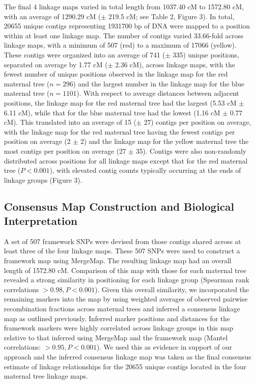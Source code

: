 \documentclass[11pt]{article}
\begin{document}
The final \num{4} linkage maps varied in total length from 1037.40 cM to 1572.80 cM, with an average of 1290.29 cM ($\pm$ 219.5 cM; see Table 2, Figure 3). 
In total, \num{20655} unique contigs representing \num{1931700} bp of DNA were mapped to a position within at least one linkage map. 
The number of contigs varied 33.66-fold across linkage maps, with a minimum of 507 (red) to a maximum of \num{17066} (yellow). 
These contigs were organized into an average of 741 ($\pm$ 335) unique positions, separated on average
by 1.77 cM ($\pm$ 2.36 cM), across linkage maps, with the fewest number of unique positions observed 
in the linkage map for the red maternal tree ($n = 296$) and the largest number in the linkage map for the blue maternal 
tree ($n = 1101$). With respect to average distances between adjacent positions, the linkage map for the red 
maternal tree had the largest (5.53 cM $\pm$ 6.11 cM), while that for the blue maternal tree had the lowest (1.16 cM $\pm$ 0.77 cM).
This translated into an average of 15 ($\pm$ 27) contigs per position on average, with the linkage map for the red maternal tree
having the fewest contigs per position on average (2 $\pm$ 2) and the linkage map for the yellow maternal tree the most contigs
per position on average (27 $\pm$ 35). Contigs were also non-randomly distributed across positions for all linkage maps except that
for the red maternal tree ($P < 0.001$), with elevated contig counts typically occurring at the ends of linkage groups (Figure 3).

\subsection*{Consensus Map Construction and Biological Interpretation}

A set of 507 framework SNPs were devised from those contigs shared across at least three of the four linkage maps. These 507 SNPs were used to construct
a framework map using MergeMap. The resulting linkage map had an overall length of 1572.80 cM. Comparison of this map with those for
each maternal tree revealed a strong similarity in positioning for each linkage group (Spearman rank correlations $> 0.98, P < 0.001$). 
Given this overall similarity, we incorporated the remaining markers into the map by using weighted averages of observed pairwise recombination 
fractions across maternal trees and inferred a consensus linkage map as outlined previously. Inferred marker positions and distances 
for the framework markers were highly correlated across linkage groups in this map relative
to that inferred using MergeMap and the framework map (Mantel correlations: $> 0.95, P < 0.001$). We used this as evidence in support of our approach and the
inferred consensus linkage map was taken as the final consensus estimate of linkage relationships for the \num{20655} unique contigs
located in the four maternal tree linkage maps.
\end{document}
